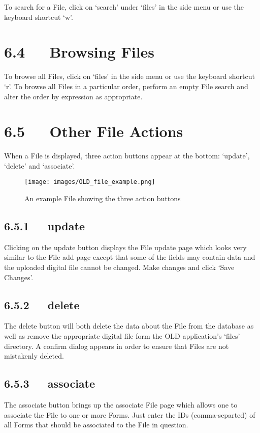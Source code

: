 \documentclass[letterpaper,10pt,english]{sphinxmanual}
\begin{document}
To search for a File, click on `search' under `files' in the side menu or use
the keyboard shortcut `w'.


\section{6.4   Browsing Files}
\label{user_guide:browsing-files}
To browse all Files, click on `files' in the side menu or use the keyboard
shortcut `r'.  To browse all Files in a particular order, perform an empty File
search and alter the order by expression as appropriate.


\section{6.5   Other File Actions}
\label{user_guide:other-file-actions}
When a File is displayed, three action buttons appear at the bottom: `update',
`delete' and `associate'.
\begin{figure}[htbp]
\centering
\capstart

\texttt{[image: images/OLD\_file\_example.png]}
\caption{An example File showing the three action buttons}\end{figure}


\subsection{6.5.1   update}
\label{user_guide:id7}
Clicking on the update button displays the File update page which looks very
similar to the File add page except that some of the fields may contain data and
the uploaded digital file cannot be changed.  Make changes and click `Save
Changes'.


\subsection{6.5.2   delete}
\label{user_guide:id8}
The delete button will both delete the data about the File from the database as
well as remove the appropriate digital file form the OLD application's `files'
directory.  A confirm dialog appears in order to ensure that Files are not
mistakenly deleted.


\subsection{6.5.3   associate}
\label{user_guide:id9}
The associate button brings up the associate File page which allows one to
associate the File to one or more Forms.  Just enter the IDs (comma-separted) of
all Forms that should be associated to the File in question.
\end{document}
